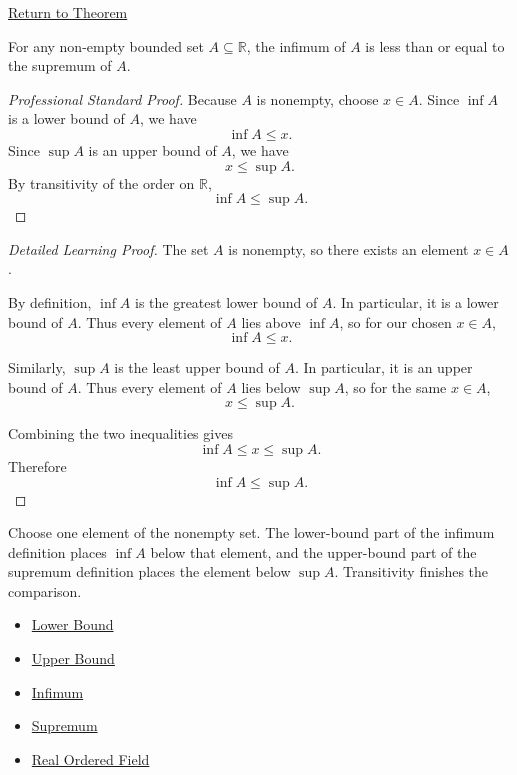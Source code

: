 \newpage
{}
\label{prf:infimum-less-than-supremum}

\begin{remark*}[Return]
\hyperref[thm:infimum-less-than-supremum]{Return to Theorem}
\end{remark*}

\begin{theorem*}
For any non-empty bounded set $A \subseteq \mathbb{R}$, the infimum of $A$ is less than or equal to the supremum of $A$.
\end{theorem*}

\begin{proof}[Professional Standard Proof]
\LRAProofBodyStart
Because \(A\) is nonempty, choose \(x\in A\). Since \(\inf A\) is a lower
bound of \(A\), we have
\[
\inf A\le x.
\]
Since \(\sup A\) is an upper bound of \(A\), we have
\[
x\le \sup A.
\]
By transitivity of the order on \(\mathbb{R}\),
\[
\inf A\le \sup A.
\]
\end{proof}

\begin{proof}[Detailed Learning Proof]
\LRAProofBodyStart
The set \(A\) is nonempty, so there exists an element \(x\in A\).

By definition, \(\inf A\) is the greatest lower bound of \(A\). In
particular, it is a lower bound of \(A\). Thus every element of \(A\) lies
above \(\inf A\), so for our chosen \(x\in A\),
\[
\inf A\le x.
\]

Similarly, \(\sup A\) is the least upper bound of \(A\). In particular, it is
an upper bound of \(A\). Thus every element of \(A\) lies below \(\sup A\), so
for the same \(x\in A\),
\[
x\le \sup A.
\]

Combining the two inequalities gives
\[
\inf A\le x\le \sup A.
\]
Therefore
\[
\inf A\le \sup A.
\]
\end{proof}

\begin{remark*}
Choose one element of the nonempty set. The lower-bound part of the infimum
definition places \(\inf A\) below that element, and the upper-bound part of
the supremum definition places the element below \(\sup A\). Transitivity
finishes the comparison.
\end{remark*}

\begin{dependencies}
\begin{itemize}
  \item \hyperref[def:lower-bound]{Lower Bound}
  \item \hyperref[def:upper-bound]{Upper Bound}
  \item \hyperref[def:infimum]{Infimum}
  \item \hyperref[def:supremum]{Supremum}
  \item \hyperref[def:real-ordered-field]{Real Ordered Field}
\end{itemize}
\end{dependencies}

\clearpage
